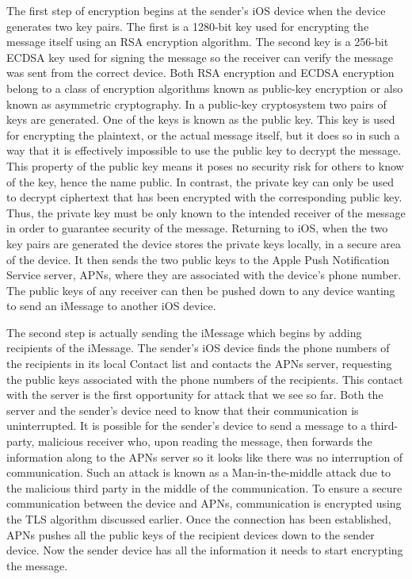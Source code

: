 The first step of encryption begins at the sender's iOS device when the device generates two key pairs.  The first is a 1280-bit key used for encrypting the message itself using an RSA encryption algorithm.  The second key is a 256-bit ECDSA key used for signing the message so the receiver can verify the message was sent from the correct device.  Both RSA encryption and ECDSA encryption belong to a class of encryption algorithms known as public-key encryption or also known as asymmetric cryptography. In a public-key cryptosystem two pairs of keys are generated.  One of the keys is known as the public key.  This key is used for encrypting the plaintext, or the actual message itself, but it does so in such a way that it is effectively impossible to use the public key to decrypt the message.  This property of the public key means it poses no security risk for others to know of the key, hence the name public.  In contrast, the private key can only be used to decrypt ciphertext that has been encrypted with the corresponding public key.  Thus, the private key must be only known to the intended receiver of the message in order to guarantee security of the message.  Returning to iOS, when the two key pairs are generated the device stores the private keys locally, in a secure area of the device.  It then sends the two public keys to the Apple Push Notification Service server, APNs, where they are associated with the device's phone number.  The public keys of any receiver can then be pushed down to any device wanting to send an iMessage to another iOS device.

The second step is actually sending the iMessage which begins by adding recipients of the iMessage.  The sender's iOS device finds the phone numbers of the recipients in its local Contact list and contacts the APNs server, requesting the public keys associated with the phone numbers of the recipients.  This contact with the server is the first opportunity for attack that we see so far.  Both the server and the sender's device need to know that their communication is uninterrupted.  It is possible for the sender's device to send a message to a third-party, malicious receiver who, upon reading the message, then forwards the information along to the APNs server so it looks like there was no interruption of communication.  Such an attack is known as a Man-in-the-middle attack due to the malicious third party in the middle of the communication.  To ensure a secure communication between the device and APNs, communication is encrypted using the TLS algorithm discussed earlier.  Once the connection has been established, APNs pushes all the public keys of the recipient devices down to the sender device.  Now the sender device has all the information it needs to start encrypting the message.

